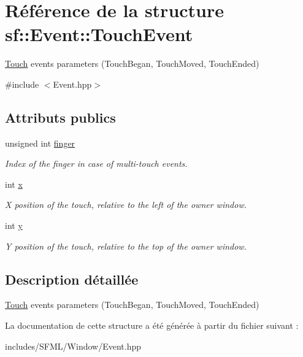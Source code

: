 \hypertarget{structsf_1_1Event_1_1TouchEvent}{}\section{Référence de la structure sf\+:\+:Event\+:\+:Touch\+Event}
\label{structsf_1_1Event_1_1TouchEvent}


\hyperlink{classsf_1_1Touch}{Touch} events parameters (Touch\+Began, Touch\+Moved, Touch\+Ended)  




{\ttfamily \#include $<$Event.\+hpp$>$}

\subsection*{Attributs publics}
\begin{DoxyCompactItemize}
\item 
\mbox{\label{structsf_1_1Event_1_1TouchEvent_a9a79fe86bf9ac3c16ec7326f96feb61a}} 
unsigned int \hyperlink{structsf_1_1Event_1_1TouchEvent_a9a79fe86bf9ac3c16ec7326f96feb61a}{finger}
\begin{DoxyCompactList}\small\item\em Index of the finger in case of multi-\/touch events. \end{DoxyCompactList}\item 
\mbox{\label{structsf_1_1Event_1_1TouchEvent_a8993963790b850caa68b98d3cad2be45}} 
int \hyperlink{structsf_1_1Event_1_1TouchEvent_a8993963790b850caa68b98d3cad2be45}{x}
\begin{DoxyCompactList}\small\item\em X position of the touch, relative to the left of the owner window. \end{DoxyCompactList}\item 
\mbox{\label{structsf_1_1Event_1_1TouchEvent_add80639dc68bc37e3275744d501cdbe0}} 
int \hyperlink{structsf_1_1Event_1_1TouchEvent_add80639dc68bc37e3275744d501cdbe0}{y}
\begin{DoxyCompactList}\small\item\em Y position of the touch, relative to the top of the owner window. \end{DoxyCompactList}\end{DoxyCompactItemize}


\subsection{Description détaillée}
\hyperlink{classsf_1_1Touch}{Touch} events parameters (Touch\+Began, Touch\+Moved, Touch\+Ended) 

La documentation de cette structure a été générée à partir du fichier suivant \+:\begin{DoxyCompactItemize}
\item 
includes/\+S\+F\+M\+L/\+Window/Event.\+hpp\end{DoxyCompactItemize}
